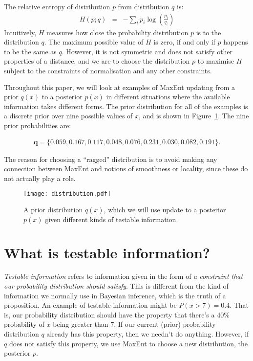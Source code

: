 \documentclass[a4paper, 11pt]{article}
\begin{document}
The relative entropy of distribution $p$ from distribution $q$ is:
\begin{eqnarray}
H(p; q) &=& -\sum_i p_i \log\left(\frac{p_i}{q_i}\right) 
\end{eqnarray}
Intuitively, $H$ measures how close the probability distribution $p$ is
to the distribution $q$. The maximum possible value of $H$ is zero, if
and only if $p$ happens to be the same as $q$.
However, it is not symmetric and does not satisfy
other properties of a distance.
and we are to choose the distribution $p$ to maximise $H$ subject to the
constraints of normalisation and any other constraints.

Throughout this paper, we will look at examples of MaxEnt updating from a prior
$q(x)$ to a posterior $p(x)$ in different situations where the available
information takes different forms. The prior distribution for all of the
examples is a discrete prior over nine possible values of $x$, and is shown
in Figure~\ref{fig:distribution}. The nine prior probabilities are:

\begin{eqnarray}
\boldsymbol{q} = \{0.059, 0.167, 0.117, 0.048, 0.076, 0.231, 0.030, 0.082, 0.191\}.
\end{eqnarray}

The reason for choosing a ``ragged'' distribution is to avoid making any
connection between MaxEnt and notions of smoothness or locality, since these
do not actually play a role.

\begin{figure}
\begin{center}
\texttt{[image: distribution.pdf]}
\caption{A prior distribution $q(x)$, which we will use
update to a posterior $p(x)$ given different kinds of testable information.
\label{fig:distribution}}
\end{center}
\end{figure}

\section{What is testable information?}
{\it Testable information} refers to information given in the form of
{\it a constraint that our probability distribution should satisfy}. This is
different from the kind of information we normally use in Bayesian inference,
which is the truth of a proposition. An example of testable information
might be $P(x > 7) = 0.4$. That is, our probability distribution should have
the property that there's a 40\% probability of $x$ being greater than 7.
If our current (prior) probability distribution $q$ already has this property,
then we needn't do anything. However, if $q$ does not satisfy this property,
we use MaxEnt to choose a new distribution, the posterior $p$.
\end{document}
